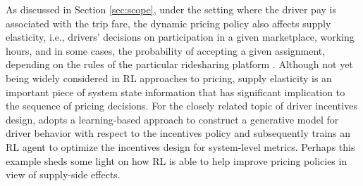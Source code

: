 \documentclass{article}
\newcommand{\rv}[1]{\textcolor{blue}{#1}}
\begin{document}
As discussed in Section \ref{sec:scope}, under the setting where the driver pay is associated with the trip fare, the dynamic pricing policy also affects supply elasticity, i.e., drivers' decisions on participation in a given marketplace, working hours, and in some cases, the probability of accepting a given assignment, depending on the rules of the particular ridesharing platform \citep{chen2016dynamic,sun2019model,angrist2021uber}. Although not yet being widely considered in RL approaches to pricing, supply elasticity is an important piece of system state information that has significant implication to the sequence of pricing decisions. For the closely related topic of driver incentives design, \cite{shang2019environment,shang2021partially} adopts a learning-based approach to construct a generative model for driver behavior with respect to the incentives policy and subsequently trains an RL agent to optimize the incentives design for system-level metrics. Perhaps this example sheds some light on how RL is able to help improve pricing policies in view of supply-side effects.
\end{document}
